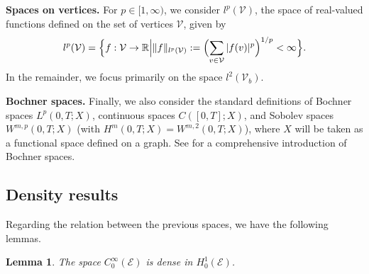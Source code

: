 \documentclass[10pt,a4paper]{amsart}
\def\to{\rightarrow}
\newtheorem{lemma}{Lemma}[section]
\begin{document}
\smallbreak

\noindent
\textbf{Spaces on vertices.} For $p\in[1,\infty)$, we consider $l^p(\mathcal{V})$, the space of real-valued functions defined on the set of vertices $\mathcal{V}$, given by
\begin{align*}
l^p(\mathcal{V})
=
\Bigl\{
  f:\mathcal{V} \to \mathbb{R}
  \Big|
  \|f\|_{l^p(\mathcal{V})}
  :=
  \Bigl(\sum_{v \in \mathcal{V}} |f(v)|^p\Bigr)^{1/p}
  < \infty
\Bigr\}.
\end{align*}
In the remainder, we focus primarily on the space $l^2(\mathcal{V}_b)$.
\smallbreak

\noindent
{\bf Bochner spaces.} Finally, we also consider the standard definitions of Bochner spaces $L^p(0,T;X)$, continuous spaces $C([0,T];X)$, and Sobolev spaces $W^{m,p}(0,T;X)$ (with $H^m(0,T;X)=W^{m,2}(0,T;X)$), where $X$ will be taken as a functional space defined on a graph. See \cite[Section 5.9.2]{evans_book} for a comprehensive introduction of Bochner spaces.



\subsection{Density results}
Regarding the relation between the previous spaces, we have the following lemmas.

    \begin{lemma}\label{lemma:dense_CinfH1}
The space $C^\infty_0(\mathcal{E})$ is dense in $H_0^1(\mathcal{E})$.
\end{lemma}
\end{document}
